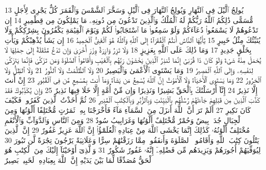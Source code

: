 {\tiny\colorbox{cl_aya}{13}} يُولِجُ ٱلَّيْلَ فِى ٱلنَّهَارِ وَيُولِجُ ٱلنَّهَارَ فِى ٱلَّيْلِ وَسَخَّرَ ٱلشَّمْسَ وَٱلْقَمَرَ كُلٌّ يَجْرِى لِأَجَلٍ مُّسَمًّى ذَٰلِكُمُ ٱللَّهُ رَبُّكُمْ لَهُ ٱلْمُلْكُ وَٱلَّذِينَ تَدْعُونَ مِن دُونِهِۦ مَا يَمْلِكُونَ مِن قِطْمِيرٍ
{\tiny\colorbox{cl_aya}{14}} إِن تَدْعُوهُمْ لَا يَسْمَعُوا۟ دُعَآءَكُمْ وَلَوْ سَمِعُوا۟ مَا ٱسْتَجَابُوا۟ لَكُمْ وَيَوْمَ ٱلْقِيَٰمَةِ يَكْفُرُونَ بِشِرْكِكُمْ وَلَا يُنَبِّئُكَ مِثْلُ خَبِيرٍ
{\tiny\colorbox{cl_aya}{15}} يَٰٓأَيُّهَا ٱلنَّاسُ أَنتُمُ ٱلْفُقَرَآءُ إِلَى ٱللَّهِ وَٱللَّهُ هُوَ ٱلْغَنِىُّ ٱلْحَمِيدُ
{\tiny\colorbox{cl_aya}{16}} إِن يَشَأْ يُذْهِبْكُمْ وَيَأْتِ بِخَلْقٍ جَدِيدٍ
{\tiny\colorbox{cl_aya}{17}} وَمَا ذَٰلِكَ عَلَى ٱللَّهِ بِعَزِيزٍ
{\tiny\colorbox{cl_aya}{18}} وَلَا تَزِرُ وَازِرَةٌ وِزْرَ أُخْرَىٰ وَإِن تَدْعُ مُثْقَلَةٌ إِلَىٰ حِمْلِهَا لَا يُحْمَلْ مِنْهُ شَىْءٌ وَلَوْ كَانَ ذَا قُرْبَىٰٓ إِنَّمَا تُنذِرُ ٱلَّذِينَ يَخْشَوْنَ رَبَّهُم بِٱلْغَيْبِ وَأَقَامُوا۟ ٱلصَّلَوٰةَ وَمَن تَزَكَّىٰ فَإِنَّمَا يَتَزَكَّىٰ لِنَفْسِهِۦ وَإِلَى ٱللَّهِ ٱلْمَصِيرُ
{\tiny\colorbox{cl_aya}{19}} وَمَا يَسْتَوِى ٱلْأَعْمَىٰ وَٱلْبَصِيرُ
{\tiny\colorbox{cl_aya}{20}} وَلَا ٱلظُّلُمَٰتُ وَلَا ٱلنُّورُ
{\tiny\colorbox{cl_aya}{21}} وَلَا ٱلظِّلُّ وَلَا ٱلْحَرُورُ
{\tiny\colorbox{cl_aya}{22}} وَمَا يَسْتَوِى ٱلْأَحْيَآءُ وَلَا ٱلْأَمْوَٰتُ إِنَّ ٱللَّهَ يُسْمِعُ مَن يَشَآءُ وَمَآ أَنتَ بِمُسْمِعٍ مَّن فِى ٱلْقُبُورِ
{\tiny\colorbox{cl_aya}{23}} إِنْ أَنتَ إِلَّا نَذِيرٌ
{\tiny\colorbox{cl_aya}{24}} إِنَّآ أَرْسَلْنَٰكَ بِٱلْحَقِّ بَشِيرًا وَنَذِيرًا وَإِن مِّنْ أُمَّةٍ إِلَّا خَلَا فِيهَا نَذِيرٌ
{\tiny\colorbox{cl_aya}{25}} وَإِن يُكَذِّبُوكَ فَقَدْ كَذَّبَ ٱلَّذِينَ مِن قَبْلِهِمْ جَآءَتْهُمْ رُسُلُهُم بِٱلْبَيِّنَٰتِ وَبِٱلزُّبُرِ وَبِٱلْكِتَٰبِ ٱلْمُنِيرِ
{\tiny\colorbox{cl_aya}{26}} ثُمَّ أَخَذْتُ ٱلَّذِينَ كَفَرُوا۟ فَكَيْفَ كَانَ نَكِيرِ
{\tiny\colorbox{cl_aya}{27}} أَلَمْ تَرَ أَنَّ ٱللَّهَ أَنزَلَ مِنَ ٱلسَّمَآءِ مَآءً فَأَخْرَجْنَا بِهِۦ ثَمَرَٰتٍ مُّخْتَلِفًا أَلْوَٰنُهَا وَمِنَ ٱلْجِبَالِ جُدَدٌۢ بِيضٌ وَحُمْرٌ مُّخْتَلِفٌ أَلْوَٰنُهَا وَغَرَابِيبُ سُودٌ
{\tiny\colorbox{cl_aya}{28}} وَمِنَ ٱلنَّاسِ وَٱلدَّوَآبِّ وَٱلْأَنْعَٰمِ مُخْتَلِفٌ أَلْوَٰنُهُۥ كَذَٰلِكَ إِنَّمَا يَخْشَى ٱللَّهَ مِنْ عِبَادِهِ ٱلْعُلَمَٰٓؤُا۟ إِنَّ ٱللَّهَ عَزِيزٌ غَفُورٌ
{\tiny\colorbox{cl_aya}{29}} إِنَّ ٱلَّذِينَ يَتْلُونَ كِتَٰبَ ٱللَّهِ وَأَقَامُوا۟ ٱلصَّلَوٰةَ وَأَنفَقُوا۟ مِمَّا رَزَقْنَٰهُمْ سِرًّا وَعَلَانِيَةً يَرْجُونَ تِجَٰرَةً لَّن تَبُورَ
{\tiny\colorbox{cl_aya}{30}} لِيُوَفِّيَهُمْ أُجُورَهُمْ وَيَزِيدَهُم مِّن فَضْلِهِۦٓ إِنَّهُۥ غَفُورٌ شَكُورٌ
{\tiny\colorbox{cl_aya}{31}} وَٱلَّذِىٓ أَوْحَيْنَآ إِلَيْكَ مِنَ ٱلْكِتَٰبِ هُوَ ٱلْحَقُّ مُصَدِّقًا لِّمَا بَيْنَ يَدَيْهِ إِنَّ ٱللَّهَ بِعِبَادِهِۦ لَخَبِيرٌۢ بَصِيرٌ
